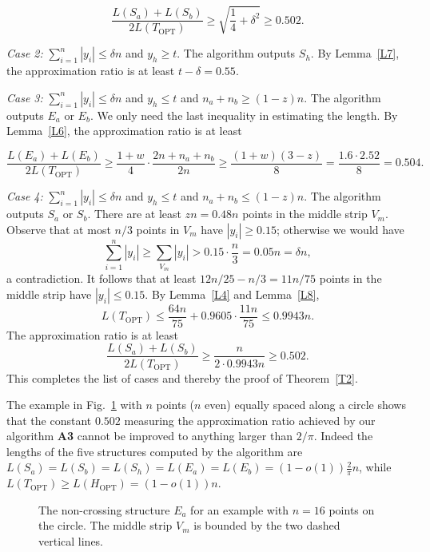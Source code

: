 \documentclass[proceedings]{stacs}
\begin{document}
$$ \frac{L(S_a)+L(S_b)}{2 L(T_\textrm{OPT})} \geq \sqrt{\frac{1}{4} + \delta^2}
\geq 0.502. $$

\smallskip
{\em Case 2:} $\sum_{i=1}^n |y_i| \leq \delta n$ and
$y_h \geq t$. The algorithm outputs $S_h$.
By Lemma~\ref{L7}, the approximation ratio is
at least $t-\delta =0.55$.

\smallskip
{\em Case 3:} $\sum_{i=1}^n |y_i| \leq \delta n$ and
$y_h \leq t$ and $n_a+n_b \geq (1-z)n$.
The algorithm outputs $E_a$ or $E_b$.
We only need the last inequality in estimating the length.
By Lemma~\ref{L6}, the approximation ratio is at least

$$ \frac{L(E_a)+L(E_b)}{2 L(T_\textrm{OPT})} \geq
\frac{1+w}{4}  \cdot \frac{2n+n_a+n_b}{2n} \geq \frac{(1+w)(3-z)}{8}
= \frac{1.6 \cdot 2.52}{8}= 0.504. $$

\smallskip
{\em Case 4:} $\sum_{i=1}^n |y_i| \leq \delta n$ and
$y_h \leq t$ and $n_a+n_b \leq (1-z)n$.
The algorithm outputs $S_a$ or $S_b$.
There are at least $z n =0.48 n$ points in the middle strip $V_m$.
Observe that at most $n/3$ points in $V_m$ have
$|y_i| \geq 0.15$; otherwise we would have
$$ \sum_{i=1}^n |y_i| \geq \sum_{V_m} |y_i| > 0.15 \cdot \frac{n}{3}
= 0.05 n =\delta n, $$
a contradiction. It follows that at least $12n/25-n/3=11n/75$
points in the middle strip have $|y_i| \leq 0.15$. By Lemma~\ref{L4}
and Lemma~\ref{L8},
$$ L(T_\textrm{OPT}) \leq \frac{64n}{75} + 0.9605 \cdot \frac{11n}{75}
\leq 0.9943 n. $$
The approximation ratio is at least
$$ \frac{L(S_a)+L(S_b)}{2 L(T_\textrm{OPT})} \geq \frac{n}{2 \cdot 0.9943 n}
\geq 0.502. $$
This completes the list of cases and thereby the proof of Theorem~\ref{T2}.


\smallskip
{}
The example in Fig.~\ref{f3} with $n$ points ($n$ even)
equally spaced along a circle shows that the constant $0.502$
measuring the approximation ratio achieved by our algorithm {\bf A3}
cannot be improved to anything larger than $2/\pi$.
Indeed the lengths of the five structures computed by the algorithm
are $L(S_a)=L(S_b)=L(S_h)=L(E_a)=L(E_b) =(1-o(1)) \frac{2}{\pi} n$,
while $L(T_\textrm{OPT}) \geq L(H_\textrm{OPT}) = (1-o(1))n$.
\begin{figure} [htb]
\centerline{\epsfxsize=2.1in }
\caption{\small The non-crossing structure $E_a$ for an example with
$n=16$ points on the circle. The middle strip $V_m$ is bounded by the
two dashed vertical lines.}
\label{f3}
\end{figure}
\end{document}
